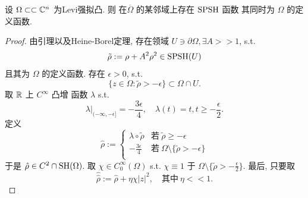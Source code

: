 \begin{proposition}
    设 $\Omega  \subset \subset {\mathbb C}^n$ 为Levi强拟凸. 
    则 在$\overline{\Omega} $ 的某邻域上存在 $\operatorname{SPSH}$ 函数 其同时为 $\Omega $ 的定义函数.  
\end{proposition}
\begin{proof}
    由引理以及Heine-Borel定理, 存在领域 $U \ni \partial \Omega , \exists A >>1$, s.t. 
    $$ \tilde{\rho }:=\rho +A^2 \rho ^2 \in \operatorname{SPSH}(U) $$
    且其为 $\Omega $ 的定义函数.  
    存在 $\epsilon >0$, s.t. 
    $$ \{z \in \Omega : \tilde{\rho }>-\epsilon \} \subset \Omega \cap U. $$  
    取 ${\mathbb R}$ 上 $C^{\infty } $ 凸增 函数 $\lambda $ s.t. 
    $$ \lambda |_{(-\infty ,-\epsilon ]} =-\frac{3 \epsilon }{4},\quad \lambda (t)=t, t \geq -\frac{\epsilon}{2}. $$  
    定义 
    $$ \hat{\rho }:= \begin{cases}
        \lambda \circ \tilde{\rho } &\text{若}~ \tilde{\rho } \geq -\epsilon \\
        - \frac{3 \epsilon }{4} &\text{若} ~ \Omega \setminus \{\tilde{\rho }>-\epsilon \}\\
    \end{cases}  $$
    于是 $\hat{\rho }\in C^2 \cap \operatorname{SH}(\Omega )$. 取 $\chi \in C_{0}^{\infty }(\Omega )$ s.t. $\chi \equiv 1$ 于 $\Omega \setminus \{\tilde{\rho }>-\frac{\epsilon }{2}\}$. 
    最后, 只要取 
    \[ \hat{\hat{\rho }}:=\hat{\rho }+\eta \chi |z|^2, \quad \text{其中}~ \eta <<1 .\]    
\end{proof}


